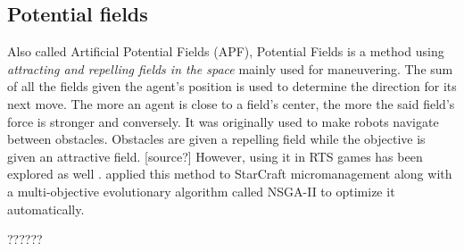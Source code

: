 \subsection{Potential fields}\label{subsec:potential-fields}

Also called Artificial Potential Fields (APF), Potential Fields is a method
using \emph{attracting and repelling fields in the space} mainly used for maneuvering.
The sum of all the fields given the agent's position is used to determine the
direction for its next move. The more an agent is close to a field's center,
the more the said field's force is stronger and conversely.
It was originally used to make robots navigate between obstacles. Obstacles are
given a repelling field while the objective is given an attractive field. [source?]
However, using it in RTS games has been explored as well \cite{HaJo08}.
\citet{BoAu12} applied this method to StarCraft micromanagement along with
a multi-objective evolutionary algorithm called NSGA-II to optimize it automatically.

???\citet{SiSuBa14}???
